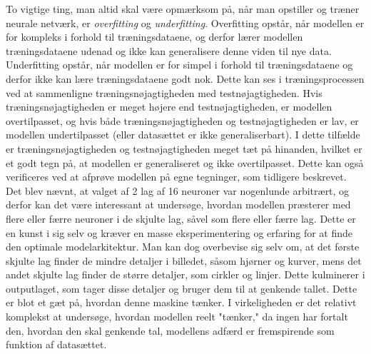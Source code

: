\documentclass{article}
\begin{document}
To vigtige ting, man altid skal være opmærksom på, når man opstiller og træner neurale netværk, er \textit{overfitting} og \textit{underfitting}. Overfitting opstår, når modellen er for kompleks i forhold til træningsdataene, og derfor lærer modellen træningsdataene udenad og ikke kan generalisere denne viden til nye data. Underfitting opstår, når modellen er for simpel i forhold til træningsdataene og derfor ikke kan lære træningsdataene godt nok. Dette kan ses i træningsprocessen ved at sammenligne træningsnøjagtigheden med testnøjagtigheden. Hvis træningsnøjagtigheden er meget højere end testnøjagtigheden, er modellen overtilpasset, og hvis både træningsnøjagtigheden og testnøjagtigheden er lav, er modellen undertilpasset (eller datasættet er ikke generaliserbart). I dette tilfælde er træningsnøjagtigheden og testnøjagtigheden meget tæt på hinanden, hvilket er et godt tegn på, at modellen er generaliseret og ikke overtilpasset. Dette kan også verificeres ved at afprøve modellen på egne tegninger, som tidligere beskrevet. Det blev nævnt, at valget af 2 lag af 16 neuroner var nogenlunde arbitrært, og derfor kan det være interessant at undersøge, hvordan modellen præsterer med flere eller færre neuroner i de skjulte lag, såvel som flere eller færre lag. Dette er en kunst i sig selv og kræver en masse eksperimentering og erfaring for at finde den optimale modelarkitektur. Man kan dog overbevise sig selv om, at det første skjulte lag finder de mindre detaljer i billedet, såsom hjørner og kurver, mens det andet skjulte lag finder de større detaljer, som cirkler og linjer. Dette kulminerer i outputlaget, som tager disse detaljer og bruger dem til at genkende tallet. \parencite{Sanderson_2017} Dette er blot et gæt på, hvordan denne maskine tænker. I virkeligheden er det relativt komplekst at undersøge, hvordan modellen reelt "tænker," da ingen har fortalt den, hvordan den skal genkende tal, modellens adfærd er fremspirende som funktion af datasættet.\\\\
\newpage
\end{document}
